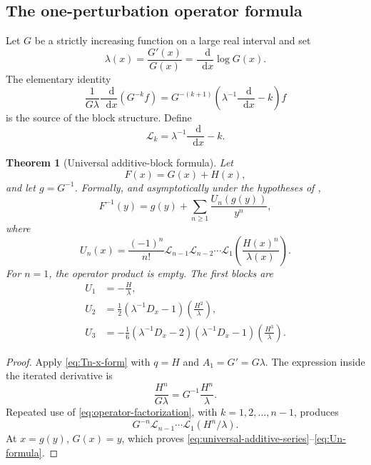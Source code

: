 \documentclass[11pt,oneside]{article}
\theoremstyle{plain}
\newtheorem{theorem}{Theorem}[section]
\theoremstyle{definition}
\theoremstyle{remark}
\newcommand{\dd}{\mathop{}\!\mathrm{d}}
\newcommand{\Lcal}{\mathcal{L}}
\begin{document}
\subsection{The one-perturbation operator formula}

Let \(G\) be a strictly increasing function on a large real interval and set
\begin{equation}
 \lambda(x)=\frac{G'(x)}{G(x)}=\frac{\dd}{\dd x}\log G(x).
 \label{eq:lambda-def}
\end{equation}
The elementary identity
\begin{equation}
 \frac1{G\lambda}\frac{\dd}{\dd x}\left(G^{-k}f\right)
 =G^{-(k+1)}\left(\lambda^{-1}\frac{\dd}{\dd x}-k\right)f
 \label{eq:operator-factorization}
\end{equation}
is the source of the block structure.  Define
\begin{equation}
 \Lcal_k=\lambda^{-1}\frac{\dd}{\dd x}-k.
 \label{eq:Lk-def}
\end{equation}

\begin{theorem}[Universal additive-block formula]
\label{thm:universal-additive}
Let
\begin{equation}
 F(x)=G(x)+H(x),
 \label{eq:F-GH}
\end{equation}
and let \(g=G^{-1}\).  Formally, and asymptotically under the hypotheses of
,
\begin{equation}
 F^{-1}(y)=g(y)+\sum_{n\ge1}\frac{U_n(g(y))}{y^n},
 \label{eq:universal-additive-series}
\end{equation}
where
\begin{equation}
 \boxed{\quad
 U_n(x)=\frac{(-1)^n}{n!}
 \Lcal_{n-1}\Lcal_{n-2}\cdots\Lcal_1
 \left(\frac{H(x)^n}{\lambda(x)}\right).
 \quad}
 \label{eq:Un-formula}
\end{equation}
For \(n=1\), the operator product is empty.  The first blocks are
\begin{align}
 U_1&=-\frac{H}{\lambda},
 \label{eq:U1}\\
 U_2&=\frac12\left(\lambda^{-1}D_x-1\right)
 \left(\frac{H^2}{\lambda}\right),
 \label{eq:U2}\\
 U_3&=-\frac16\left(\lambda^{-1}D_x-2\right)
 \left(\lambda^{-1}D_x-1\right)
 \left(\frac{H^3}{\lambda}\right).
 \label{eq:U3}
\end{align}
\end{theorem}
\begin{proof}
Apply \eqref{eq:Tn-x-form} with \(q=H\) and
\(A_1=G'=G\lambda\).  The expression inside the iterated derivative is
\[
 \frac{H^n}{G\lambda}=G^{-1}\frac{H^n}{\lambda}.
\]
Repeated use of \eqref{eq:operator-factorization}, with
\(k=1,2,\ldots,n-1\), produces
\[
 G^{-n}\Lcal_{n-1}\cdots\Lcal_1(H^n/\lambda).
\]
At \(x=g(y)\), \(G(x)=y\), which proves
\eqref{eq:universal-additive-series}--\eqref{eq:Un-formula}.
\end{proof}
\end{document}
